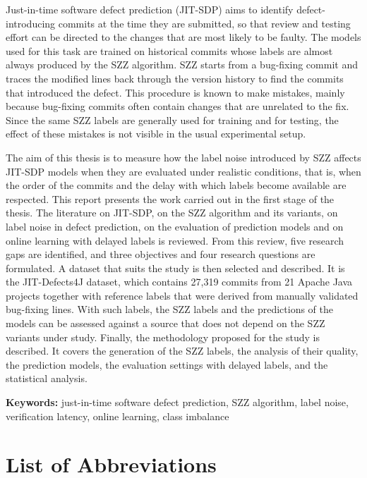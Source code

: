 \documentclass[12pt,a4paper,oneside]{report}
\begin{document}
Just-in-time software defect prediction (JIT-SDP) aims to identify
defect-introducing commits at the time they are submitted, so that review and
testing effort can be directed to the changes that are most likely to be
faulty. The models used for this task are trained on historical commits whose
labels are almost always produced by the SZZ algorithm. SZZ starts from a
bug-fixing commit and traces the modified lines back through the version
history to find the commits that introduced the defect. This procedure is known
to make mistakes, mainly because bug-fixing commits often contain changes that
are unrelated to the fix. Since the same SZZ labels are generally used for
training and for testing, the effect of these mistakes is not visible in the
usual experimental setup.

The aim of this thesis is to measure how the label noise introduced by SZZ
affects JIT-SDP models when they are evaluated under realistic conditions,
that is, when the order of the commits and the delay with which labels become
available are respected. This report presents the work carried out in the
first stage of the thesis.
The literature on JIT-SDP, on the SZZ algorithm and its variants, on label
noise in defect prediction, on the evaluation of prediction models and on
online learning with delayed labels is reviewed. From this review, five
research gaps are identified, and three objectives and four research
questions are formulated. A dataset that suits the study is then selected and
described. It is the JIT-Defects4J dataset, which contains 27,319 commits from
21 Apache Java projects together with reference labels that were derived from
manually validated bug-fixing lines. With such labels, the SZZ labels and the
predictions of the models can be assessed against a source that does not
depend on the SZZ variants under study. Finally, the methodology proposed for
the study is described. It covers the generation of the SZZ labels, the
analysis of their quality, the prediction models, the evaluation settings
with delayed labels, and the statistical analysis.

\vspace{0.5em}
\noindent\textbf{Keywords:} just-in-time software defect prediction, SZZ
algorithm, label noise, verification latency, online learning, class imbalance

{\singlespacing
\tableofcontents
\listoffigures
\listoftables
}

\chapter*{List of Abbreviations}
\end{document}
